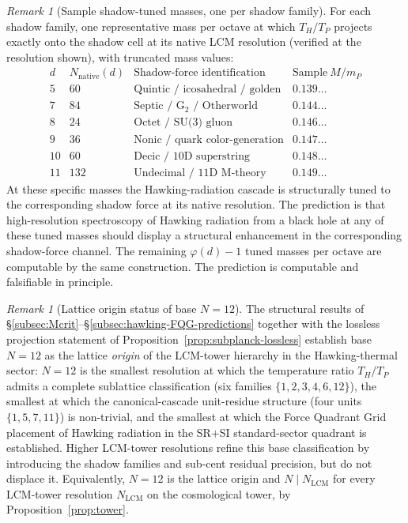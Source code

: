 \documentclass[11pt,a4paper]{article}
\theoremstyle{definition}
\theoremstyle{remark}
\newtheorem{remark}[theorem]{Remark}
\begin{document}
\begin{remark}[Sample shadow-tuned masses, one per shadow family]\label{rem:shadow-tuning-sample}
For each shadow family, one representative mass per octave at which $T_{H}/T_{P}$ projects exactly onto the shadow cell at its native LCM resolution (verified at the resolution shown), with truncated mass values:
\[
\begin{array}{c|c|l|l}
d & N_{\text{native}}(d) & \text{Shadow-force identification} & \text{Sample}~M/m_{P} \\ \hline
5  & 60  & \text{Quintic / icosahedral / golden} & 0.139\ldots \\
7  & 84  & \text{Septic / G$_{2}$ / Otherworld} & 0.144\ldots \\
8  & 24  & \text{Octet / SU(3) gluon} & 0.146\ldots \\
9  & 36  & \text{Nonic / quark color-generation} & 0.147\ldots \\
10 & 60  & \text{Decic / 10D superstring} & 0.148\ldots \\
11 & 132 & \text{Undecimal / 11D M-theory} & 0.149\ldots
\end{array}
\]
At these specific masses the Hawking-radiation cascade is structurally tuned to the corresponding shadow force at its native resolution. The prediction is that high-resolution spectroscopy of Hawking radiation from a black hole at any of these tuned masses should display a structural enhancement in the corresponding shadow-force channel. The remaining $\varphi(d)-1$ tuned masses per octave are computable by the same construction. The prediction is computable and falsifiable in principle.
\end{remark}

\begin{remark}[Lattice origin status of base $N=12$]\label{rem:N12-origin}
The structural results of \S\ref{subsec:Mcrit}--\S\ref{subsec:hawking-FQG-predictions} together with the lossless projection statement of Proposition~\ref{prop:subplanck-lossless} establish base $N=12$ as the lattice \emph{origin} of the LCM-tower hierarchy in the Hawking-thermal sector: $N=12$ is the smallest resolution at which the temperature ratio $T_{H}/T_{P}$ admits a complete sublattice classification (six families $\{1,2,3,4,6,12\}$), the smallest at which the canonical-cascade unit-residue structure (four units $\{1,5,7,11\}$) is non-trivial, and the smallest at which the Force Quadrant Grid placement of Hawking radiation in the SR$+$SI standard-sector quadrant is established. Higher LCM-tower resolutions refine this base classification by introducing the shadow families and sub-cent residual precision, but do not displace it. Equivalently, $N=12$ is the lattice origin and $N \mid N_{\text{LCM}}$ for every LCM-tower resolution $N_{\text{LCM}}$ on the cosmological tower, by Proposition~\ref{prop:tower}.
\end{remark}
\end{document}
